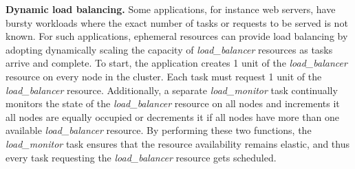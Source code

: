 \textbf{Dynamic load balancing.} Some applications, for instance web servers, have bursty workloads where the exact number of tasks or requests to be served is not known. For such applications, ephemeral resources can provide load balancing by adopting dynamically scaling the capacity of \textit{load\_balancer} resources as tasks arrive and complete. To start, the application creates 1 unit of the \textit{load\_balancer} resource on every node in the cluster. Each task must request 1 unit of the \textit{load\_balancer} resource. Additionally, a separate \textit{load\_monitor} task continually monitors the state of the \textit{load\_balancer} resource on all nodes and increments it all nodes are equally occupied or decrements it if all nodes have more than one available \textit{load\_balancer} resource. By performing these two functions, the \textit{load\_monitor} task ensures that the resource availability remains elastic, and thus every task requesting the \textit{load\_balancer} resource gets scheduled.






